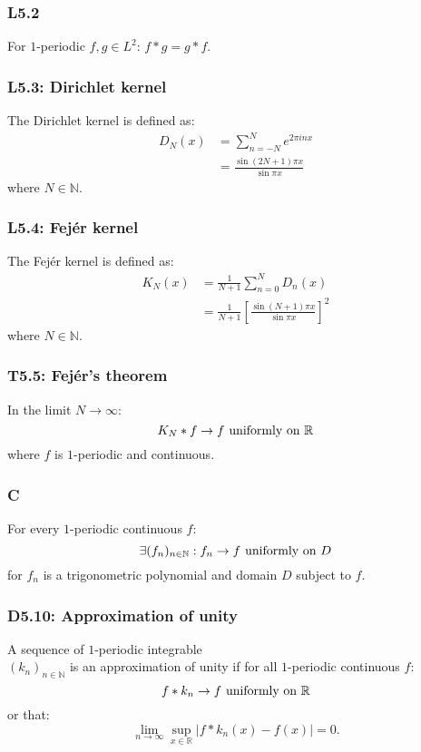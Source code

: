 \documentclass{article}
\begin{document}
\begin{multicols*}{3}
\subsubsection*{L5.2}
For $1$-periodic $f,g\in L^2$:
$f*g=g*f$.

\subsubsection*{L5.3: Dirichlet kernel}
The Dirichlet kernel is defined as:
\begin{align*}
    D_N(x)
    &=\sum_{n=-N}^{N}e^{2\pi inx} \\
    &=\frac{\sin(2N+1)\pi x}{\sin\pi x}
\end{align*}
where $N\in\mathbb{N}$.

\subsubsection*{L5.4: Fej\'er kernel}
The Fej\'er kernel is defined as:
\begin{align*}
    K_N(x)
    &=\frac{1}{N+1}
    \sum_{n=0}^{N}D_n(x) \\
    &=\frac{1}{N+1}
    \left[\frac{\sin(N+1)\pi x}
    {\sin\pi x}\right]^2
\end{align*}
where $N\in\mathbb{N}$.

\subsubsection*{T5.5: Fej\'er's theorem}
In the limit $N\rightarrow\infty$:
$$K_N*f\rightarrow f\hspace{0.05in}
\text{uniformly on $\mathbb{R}$}$$
where $f$ is $1$-periodic and continuous.

\subsubsection*{C}
For every $1$-periodic continuous $f$:
$$\exists(f_n)_{n\in\mathbb{N}}
:f_n\rightarrow f\hspace{0.05in}\text{uniformly on $D$}$$
for $f_n$ is a trigonometric polynomial
and domain $D$ subject to $f$.

\subsubsection*{D5.10: Approximation of unity}
A sequence of $1$-periodic integrable \\
$(k_n)_{n\in\mathbb{N}}$ is an approximation
of unity if for all $1$-periodic continuous $f$:
$$f*k_n\rightarrow f\hspace{0.05in}
\text{uniformly on $\mathbb{R}$}$$
or that:
$$\lim_{n\rightarrow\infty}
\sup_{x\in\mathbb{R}}
|f*k_n(x)-f(x)|=0.$$


\end{multicols*}
\end{document}
